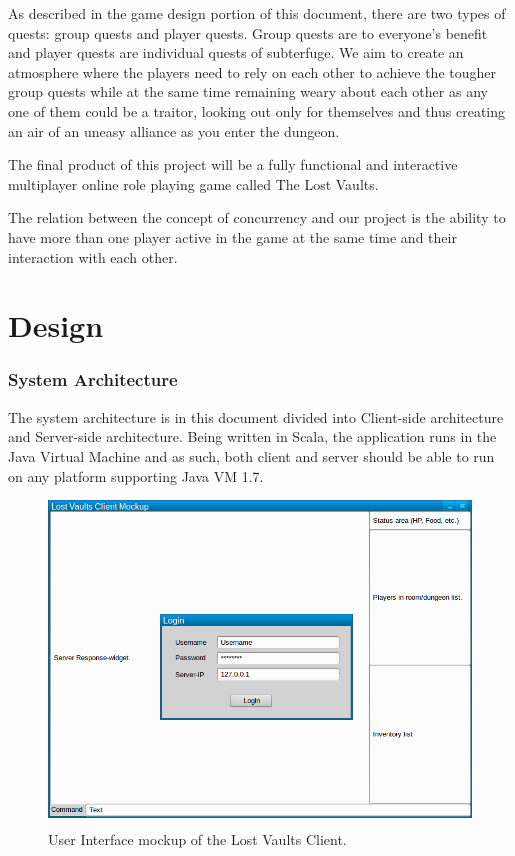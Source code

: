 \documentclass[a4paper]{article}
\begin{document}
As described in the game design portion of this document, there are two types of quests: group quests and player quests. Group quests are to everyone's benefit and player 
quests are individual quests of subterfuge. We aim to create an atmosphere where the players need to rely on each other to achieve the tougher group quests while at the same 
time remaining weary about each other as any one of them could be a traitor, looking out only for themselves and thus creating an air of an uneasy alliance as you enter the dungeon.

The final product of this project will be a fully functional and interactive multiplayer online role playing game called The Lost Vaults.

The relation between the concept of concurrency and our project is the ability to have more than one player active in the game at the same time and their interaction with each other.
\part{Design}
\section{System Architecture}
The system architecture is in this document divided into  Client-side architecture and Server-side architecture. Being written in Scala, the application runs in the Java Virtual Machine and 
as such, both client and server should be able to run on any platform supporting Java VM 1.7.
\begin{figure}[hbt]
\centering
\includegraphics[width=1.0\textwidth]{clientmockup}
\caption{\label{fig:Client}User Interface mockup of the Lost Vaults Client.}
\end{figure}
\end{document}
